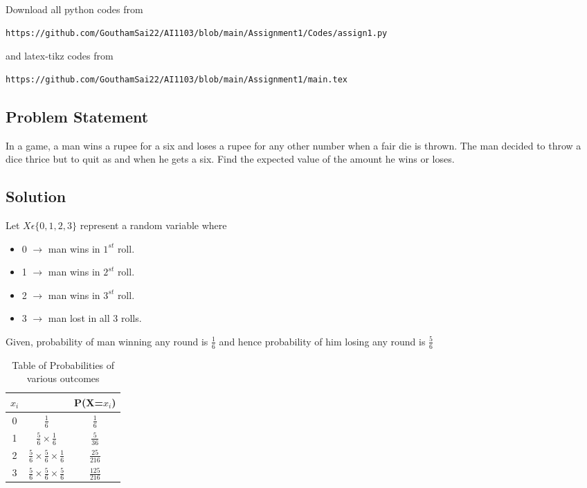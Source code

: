 \documentclass[journal,12pt,twocolumn]{IEEEtran}
\begin{document}
\maketitle
\newpage
\bigskip
\renewcommand{\thefigure}{\theenumi}
\renewcommand{\thetable}{\theenumi}
Download all python codes from 
\begin{lstlisting}
https://github.com/GouthamSai22/AI1103/blob/main/Assignment1/Codes/assign1.py
\end{lstlisting}
%
and latex-tikz codes from 
%
\begin{lstlisting}
https://github.com/GouthamSai22/AI1103/blob/main/Assignment1/main.tex
\end{lstlisting}
\begin{center}
  \section{\textbf{Problem Statement}} 
\end{center}
In a game, a man wins a rupee for a six and loses a rupee for any other number when a fair die is thrown. The man decided to throw a dice thrice but to quit as and when he gets a six. Find the expected value of the amount he wins or loses.
\begin{center}
   \section{\textbf{Solution}}
\end{center}
Let $X \epsilon \{0,1,2,3\}$ represent a random variable where
\begin{itemize}
    \item 0 $\rightarrow$ man wins in $1^{st}$ roll.
    \item 1 $\rightarrow$ man wins in $2^{st}$ roll.
    \item 2 $\rightarrow$ man wins in $3^{st}$ roll.
    \item 3 $\rightarrow$ man lost in all 3 rolls.
\end{itemize}
Given, probability of man winning any round is $\frac{1}{6}$ and hence probability of him losing any round is $\frac{5}{6}$
\begin{table}[h!]
    \centering
     \begin{tabular}{|c|c|c|}
      \hline
      $x_i$ & & P(X=$x_i$)  \\
      \hline
      0 & $\frac{1}{6}$ & $\frac{1}{6}$ \\[1 ex]
      \hline
      1 & $\frac{5}{6} \times \frac{1}{6}$ & $\frac{5}{36}$ \\[1 ex]
      \hline
      2 & $\frac{5}{6} \times \frac{5}{6} \times \frac{1}{6}$ & $\frac{25}{216}$ \\[1 ex]
      \hline
      3 & $\frac{5}{6} \times \frac{5}{6} \times \frac{5}{6}$ & $\frac{125}{216}$ \\[1 ex]
      \hline
    \end{tabular}
    \caption{Table of Probabilities of various outcomes}
    \label{table:1}
\end{table}
\end{document}
